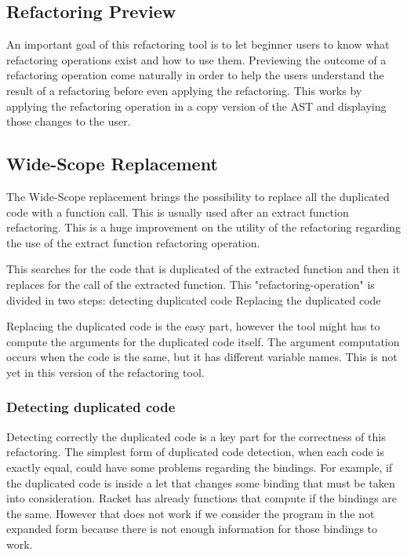 \subsection{Refactoring Preview}
An important goal of this refactoring tool is to let beginner users to know what
refactoring operations exist and how to use them.
Previewing the outcome of a refactoring operation come naturally in order to
help the users understand the result of a refactoring before even applying the refactoring.
This works by applying the refactoring operation in a copy version of the AST
and displaying those changes to the user.

\subsection{Wide-Scope Replacement} %
The Wide-Scope replacement brings the possibility to replace all the duplicated
code with a function call. This is usually used after an extract function refactoring.
This is a huge improvement on the utility of the refactoring regarding the use
of the extract function refactoring operation.

This searches for the code that is duplicated of the extracted function and then it replaces for the call of the
extracted function.
This "refactoring-operation" is divided in two steps:
detecting duplicated code
Replacing the duplicated code

Replacing the duplicated code is the easy part, however the tool might has to compute
the arguments for the duplicated code itself. The argument computation occurs when
the code is the same, but it has different variable names. This is not yet in this
version of the refactoring tool.

\subsubsection{Detecting duplicated code}
Detecting correctly the duplicated code is a key part for the correctness of this refactoring.
The simplest form of duplicated code detection, when each code is exactly equal,
could have some problems regarding the bindings.
For example, if the duplicated code is inside a let that changes some binding that must
be taken into consideration.
Racket has already functions that compute if the bindings are the same.
However that does not work if we consider the program in the not expanded
form because there is not enough information for those bindings to work.

